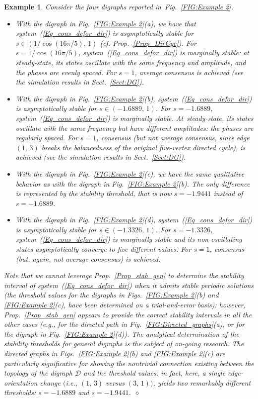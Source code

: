 \documentclass[letterpaper,9pt,twocolumn]{autart}
\newtheorem{example}{\textbf{Example}}
\begin{document}
\begin{example}\label{Example2}
Consider the four digraphs reported in~Fig.~\ref{FIG:Example 2}.
\begin{itemize}
\item With the digraph in Fig.~\ref{FIG:Example 2}(a), we have that
system~(\ref{Eq_cons_defor_dir}) is asymptotically stable for $s \in
(1/\cos(16\pi/5),\,1)$ (cf. Prop.~\ref{Prop_DirCyc}). For $s =
1/\cos(16\pi/5)$, system~(\ref{Eq_cons_defor_dir}) is marginally
stable: at steady-state, its states oscillate with the same frequency and amplitude, and the phases are evenly spaced.
For $s = 1$, average consensus is achieved (see the simulation results
in Sect.~\ref{Sect:DG}). 
\item With the digraph in Fig.~\ref{FIG:Example 2}(b),
system~(\ref{Eq_cons_defor_dir}) is asymptotically stable for $s \in
(-1.6889,\,1)$. For $s = -1.6889$, system~(\ref{Eq_cons_defor_dir}) is
marginally stable. At~steady-state, its states oscillate with the same
frequency but have different amplitudes: the phases are regularly
spaced. For \mbox{$s = 1$}, consensus (but not average consensus, since edge
$(1,\,3)$ breaks the balancedness of the original \mbox{five-vertex} directed
cycle), is achieved (see the simulation results in Sect.~\ref{Sect:DG}).
\item With the digraph in Fig.~\ref{FIG:Example 2}(c), we have the 
same qualitative behavior as with the digraph in 
Fig.~\ref{FIG:Example 2}(b). The only difference is represented by the stability threshold, that is now
$s = -1.9441$ instead of $s = -1.6889$.
\item With the digraph in Fig.~\ref{FIG:Example 2}(d),
system~(\ref{Eq_cons_defor_dir}) is asymptotically stable for $s \in
(-1.3326,\,1)$. For $s = -1.3326$, system~(\ref{Eq_cons_defor_dir}) is 
marginally stable and its \emph{non-oscillating} states asymptotically
converge to five different values. For $s = 1$, consensus (but, again, not average \mbox{consensus}) is achieved.
\end{itemize}
Note that we cannot leverage Prop.~\ref{Prop_stab_gen} to determine the stability interval 
of system~(\ref{Eq_cons_defor_dir}) when it admits stable periodic 
solutions (the threshold values for the digraphs in Figs.~\ref{FIG:Example 2}(b) and 
\ref{FIG:Example 2}(c), have been determined on a trial-and-error basis): however, Prop.~\ref{Prop_stab_gen} appears to provide the
correct stability intervals in all the other cases (e.g., for the
directed path in Fig.~\ref{FIG:Directed_graphs}(a), or for the digraph in 
Fig.~\ref{FIG:Example 2}(d)). 
The analytical determination of the stability
thresholds for general digraphs is the subject of \mbox{on-going} research. The directed graphs in Figs.~\ref{FIG:Example 2}(b) and \ref{FIG:Example 2}(c)
are particularly significative for showing the nontrivial connection
existing between the topology of the digraph $\mathcal{D}$ and 
the threshold values: in fact, here, a single edge-orientation change 
$($i.e., $(1,\,3)$ versus $(3,\,1))$, yields two remarkably different
thresholds: $s = -1.6889$ and $s = -1.9441$.~\hfill$\diamond$
\end{example}
\end{document}
